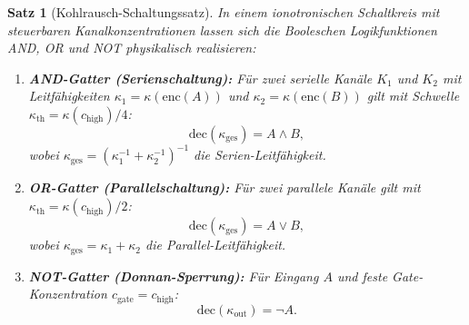 ﻿\documentclass[a4paper,12pt]{article}
\theoremstyle{plain}
\newtheorem{satz}{Satz}
\theoremstyle{definition}
\theoremstyle{remark}
\newcommand{\chigh}{c_{\mathrm{high}}}
\newcommand{\kth}{\kappa_{\mathrm{th}}}
\newcommand{\kges}{\kappa_{\mathrm{ges}}}
\begin{document}
\begin{satz}[Kohlrausch-Schaltungssatz]
\label{satz:kohlrausch}
In einem ionotronischen Schaltkreis mit steuerbaren Kanalkonzentrationen
lassen sich die Booleschen Logikfunktionen AND, OR und NOT physikalisch
realisieren:

\begin{enumerate}[label=(\roman*)]
\item \textbf{AND-Gatter (Serienschaltung):}
      F\"ur zwei serielle Kan\"ale $K_1$ und $K_2$ mit Leitf\"ahigkeiten
      $\kappa_1 = \kappa(\mathrm{enc}(A))$ und $\kappa_2 = \kappa(\mathrm{enc}(B))$
      gilt mit Schwelle $\kth = \kappa(\chigh)/4$:
      \[
      \mathrm{dec}(\kges) = A \wedge B,
      \]
      wobei $\kges = (\kappa_1^{-1} + \kappa_2^{-1})^{-1}$ die
      Serien-Leitf\"ahigkeit.

\item \textbf{OR-Gatter (Parallelschaltung):}
      F\"ur zwei parallele Kan\"ale gilt mit $\kth = \kappa(\chigh)/2$:
      \[
      \mathrm{dec}(\kges) = A \vee B,
      \]
      wobei $\kges = \kappa_1 + \kappa_2$ die Parallel-Leitf\"ahigkeit.

\item \textbf{NOT-Gatter (Donnan-Sperrung):}
      F\"ur Eingang $A$ und feste Gate-Konzentration $c_{\mathrm{gate}} = \chigh$:
      \[
      \mathrm{dec}(\kappa_{\mathrm{out}}) = \neg A.
      \]
\end{enumerate}
\end{satz}
\end{document}
